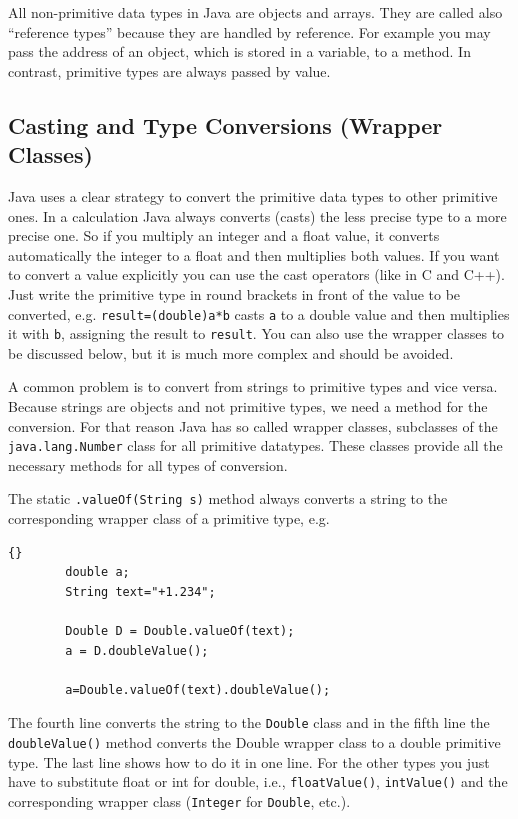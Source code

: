 All non-primitive data types in Java are objects and arrays. They are
called also ``reference types'' because they are handled by
reference. For example you may pass the address of an object, which is
stored in a variable, to a method. In contrast, primitive types are
always passed by value.


\subsection{Casting and Type Conversions (Wrapper Classes)}

Java uses a clear strategy to convert the primitive data types to 
other primitive ones. In a calculation Java always converts (casts)
the less precise type to a more precise one. So if you multiply an
integer and a float value, it converts automatically the integer to
a float and then multiplies both values. If you want to convert
a value explicitly you can use the cast operators (like in C and C++).
Just write the primitive type in round brackets in front of the value to
be converted, e.g. \verb|result=(double)a*b| casts \verb|a| to 
a double value and
then multiplies it with \verb|b|, assigning the result to \verb|result|.
You can also use the wrapper classes to be discussed below, but
it is much more complex and should be avoided.

A common problem is to convert from strings to primitive types and
vice versa. Because strings are objects and not primitive types, we
need a method for the conversion. For that reason Java has so called
wrapper classes, subclasses of the \verb|java.lang.Number| class 
for all primitive datatypes. 
These classes provide all the necessary methods for all types of
conversion. 

The static \verb|.valueOf(String s)| method always converts a string
to the corresponding wrapper class of a primitive type, e.g. 
\begin{lstlisting}{}
        double a;
        String text="+1.234";

        Double D = Double.valueOf(text);
        a = D.doubleValue();

        a=Double.valueOf(text).doubleValue();
\end{lstlisting}
The fourth line converts the string to the \verb|Double| class and in the
fifth line 
the \verb|doubleValue()| method converts the Double wrapper class 
to a double primitive type. The last line shows how to do it in
one line.
For the other types you just have to substitute float or int 
for double, i.e., \verb|floatValue()|, \verb|intValue()| and the
corresponding wrapper class (\verb|Integer| for \verb|Double|, etc.).
 
